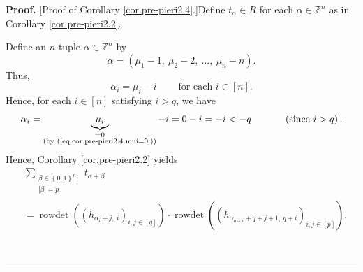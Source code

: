 \documentclass
[numbers=enddot,12pt,final,onecolumn,notitlepage,english]{scrartcl}%
\theoremstyle{definition}
\newenvironment{proof}[1][Proof]{\noindent\textbf{#1.} }{\ \rule{0.5em}{0.5em}}
\let\sumnonlimits\sum
\renewcommand{\sum}{\sumnonlimits\limits}
\newenvironment{verlong}{}{}
\begin{document}
\begin{verlong}
\begin{proof}
[Proof of Corollary \ref{cor.pre-pieri2.4}.]Define $t_{\alpha}\in R$ for each
$\alpha\in\mathbb{Z}^{n}$ as in Corollary \ref{cor.pre-pieri2.2}.

Define an $n$-tuple $\alpha\in\mathbb{Z}^{n}$ by%
\[
\alpha=\left(  \mu_{1}-1,\ \mu_{2}-2,\ \ldots,\ \mu_{n}-n\right)  .
\]
Thus,%
\begin{equation}
\alpha_{i}=\mu_{i}-i\ \ \ \ \ \ \ \ \ \ \text{for each }i\in\left[  n\right]
. \label{pf.cor.pre-pieri2.4.ali=}%
\end{equation}
Hence, for each $i\in\left[  n\right]  $ satisfying $i>q$, we have%
\[
\alpha_{i}=\underbrace{\mu_{i}}_{\substack{=0\\\text{(by
(\ref{eq.cor.pre-pieri2.4.mui=0}))}}}-i=0-i=-i<-q\ \ \ \ \ \ \ \ \ \ \left(
\text{since }i>q\right)  .
\]
Hence, Corollary \ref{cor.pre-pieri2.2} yields
\begin{align}
&  \sum_{\substack{\beta\in\left\{  0,1\right\}  ^{n};\\\left\vert
\beta\right\vert =p}}t_{\alpha+\beta}\nonumber\\
&  =\operatorname*{rowdet}\left(  \left(  h_{\alpha_{i}+j,\ i}\right)
_{i,j\in\left[  q\right]  }\right)  \cdot\operatorname*{rowdet}\left(  \left(
h_{\alpha_{q+i}+q+j+1,\ q+i}\right)  _{i,j\in\left[  p\right]  }\right)  .
\label{pf.cor.pre-pieri2.4.old}%
\end{align}



\end{proof}
\end{verlong}
\end{document}
